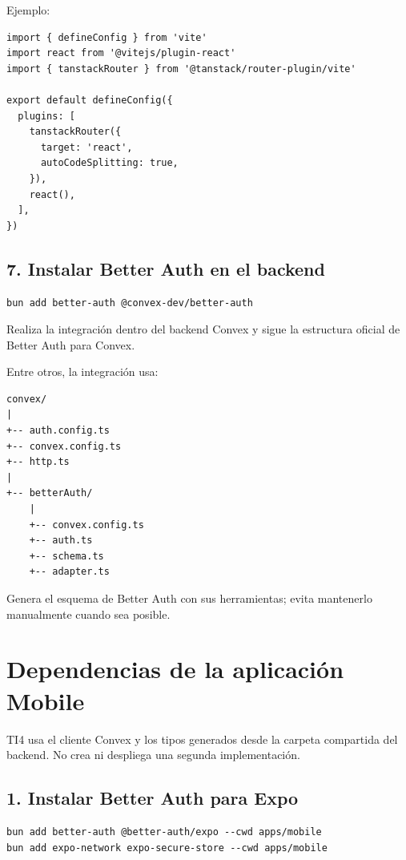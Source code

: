 \documentclass[11pt,a4paper]{article}
\begin{document}
Ejemplo:

\begin{lstlisting}
import { defineConfig } from 'vite'
import react from '@vitejs/plugin-react'
import { tanstackRouter } from '@tanstack/router-plugin/vite'

export default defineConfig({
  plugins: [
    tanstackRouter({
      target: 'react',
      autoCodeSplitting: true,
    }),
    react(),
  ],
})
\end{lstlisting}

\subsection{7. Instalar Better Auth en el backend}

\begin{lstlisting}
bun add better-auth @convex-dev/better-auth
\end{lstlisting}

Realiza la integración dentro del backend Convex y sigue la estructura oficial
de Better Auth para Convex.

Entre otros, la integración usa:

\begin{lstlisting}
convex/
|
+-- auth.config.ts
+-- convex.config.ts
+-- http.ts
|
+-- betterAuth/
    |
    +-- convex.config.ts
    +-- auth.ts
    +-- schema.ts
    +-- adapter.ts
\end{lstlisting}

Genera el esquema de Better Auth con sus herramientas; evita mantenerlo
manualmente cuando sea posible.

\section{Dependencias de la aplicación Mobile}

TI4 usa el cliente Convex y los tipos generados desde la carpeta compartida del
backend. No crea ni despliega una segunda implementación.

\subsection{1. Instalar Better Auth para Expo}

\begin{lstlisting}
bun add better-auth @better-auth/expo --cwd apps/mobile
bun add expo-network expo-secure-store --cwd apps/mobile
\end{lstlisting}
\end{document}
